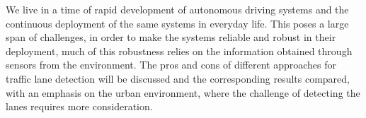 
\abstract

We live in a time of rapid development of autonomous driving systems and the continuous deployment of the same systems in everyday life. This poses a large span of challenges, in order to make the systems reliable and robust in their deployment, much of this robustness relies on the information obtained through sensors from the environment. The pros and cons of different approaches for traffic lane detection will be discussed and the corresponding results compared, with an emphasis on the urban environment, where the challenge of detecting the lanes requires more consideration. 